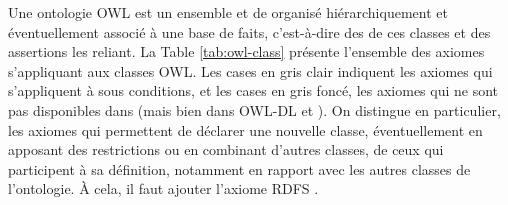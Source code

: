 Une ontologie OWL est un ensemble  et de  organisé hiérarchiquement et éventuellement associé à une base de faits, c'est-à-dire des  de ces classes et des assertions les reliant.
La Table \ref{tab:owl-class} présente l'ensemble des axiomes s'appliquant aux classes OWL. 
Les cases en gris clair indiquent les axiomes qui s'appliquent à  sous conditions, et les cases en gris foncé, les axiomes qui ne sont pas disponibles dans  (mais bien dans OWL-DL et ).
On distingue en particulier, les axiomes qui permettent de déclarer une nouvelle classe, éventuellement en apposant des restrictions ou en combinant d'autres classes, de ceux qui participent à sa définition, notamment en rapport avec les autres classes de l'ontologie.
À cela, il faut ajouter l'axiome RDFS .


